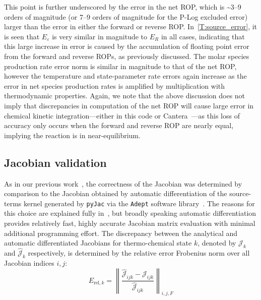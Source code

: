 \documentclass[12pt,number,sort&compress,preprint]{elsarticle}
\begin{document}
This point is further underscored by the error in the net ROP, which is \textasciitilde\numrange{3}{9} orders of magnitude (or \numrange{7}{9} orders of magnitude for the P-Log excluded error) larger than the error in either the forward or reverse ROP.
In~\cref{T:source_error}, it is seen that $E_{\varepsilon}$ is very similar in magnitude to $E_R$ in all cases, indicating that this large increase in error is caused by the accumulation of floating point error from the forward and reverse ROPs, as previously discussed.
The molar species production rate error norm is similar in magnitude to that of the net ROP, however the temperature and state-parameter rate errors again increase as the error in net species production rates is amplified by multiplication with thermodynamic properties.
Again, we note that the above discussion does not imply that discrepancies in computation of the net ROP will cause large error in chemical kinetic integration---either in this code or Cantera~\cite{Cantera}---as this loss of accuracy only occurs when the forward and reverse ROP are nearly equal, implying the reaction is in near-equilibrium.

\subsection{Jacobian validation}

As in our previous work~\cite{Niemeyer:2016aa}, the correctness of the Jacobian was determined by comparison to the Jacobian obtained by automatic differentiation of the source-terms kernel generated by \texttt{pyJac} via the \texttt{Adept} software library~\cite{adept-v11,hogan2014fast}.
The reasons for this choice are explained fully in~\cite{Niemeyer:2016aa}, but broadly speaking automatic differentiation provides relatively fast, highly accurate Jacobian matrix evaluation with minimal additional programming effort.
The discrepancy between the analytical and automatic differentiated Jacobians for thermo-chemical state $k$, denoted by $\mathcal{J}_k$ and $\hat{\mathcal{J}}_k$ respectively, is determined by the relative error Frobenius norm over all Jacobian indices $i, j$:
\begin{equation}
 \label{e:jac_error_base}
 E_{\text{rel}, k} = \left\lVert \frac{\hat{\mathcal{J}}_{ijk} - \mathcal{J}_{ijk}}{\hat{\mathcal{J}}_{ijk}} \right\rVert_{i,j,F}
\end{equation}
\end{document}
